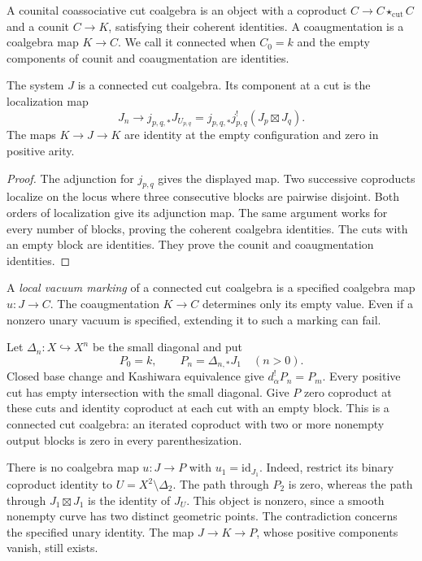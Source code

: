 A counital coassociative cut coalgebra is an object with a
coproduct \(C\to C\star_{\mathrm{cut}}C\) and a counit
\(C\to K\), satisfying their coherent identities. A coaugmentation
is a coalgebra map \(K\to C\). We call it connected when
\(C_0=k\) and the empty components of counit and coaugmentation
are identities.

\begin{proposition}\label{v4-prop:word-vacuum-coalgebra}
The system \(J\) is a connected cut coalgebra. Its component at a
cut is the localization map
\begin{equation}\label{v4-eq:word-vacuum-coproduct}
 J_n\longrightarrow j_{p,q,*}J_{U_{p,q}}
       =j_{p,q,*}j_{p,q}^!(J_p\boxtimes J_q).
\end{equation}
The maps \(K\to J\to K\) are identity at the empty
configuration and zero in positive arity.
\end{proposition}

\begin{proof}
The adjunction for \(j_{p,q}\) gives the displayed map.
Two successive coproducts localize on the locus where three
consecutive blocks are pairwise disjoint. Both orders of
localization give its adjunction map. The same argument works for
every number of blocks, proving the coherent coalgebra identities.
The cuts with an empty block are identities. They prove the
counit and coaugmentation identities.
\end{proof}

A \emph{local vacuum marking} of a connected cut coalgebra is a
specified coalgebra map \(u:J\to C\). The coaugmentation
\(K\to C\) determines only its empty value. Even if a nonzero
unary vacuum is specified, extending it to such a marking can fail.

\begin{example}
\label{v4-ex:word-vacuum-obstruction}
Let \(\Delta_n:X\hookrightarrow X^n\) be the small diagonal and put
\[
 P_0=k,\qquad P_n=\Delta_{n,*}J_1\quad(n>0).
\]
Closed base change and Kashiwara equivalence give
\(d_\alpha^!P_n=P_m\). Every positive cut has empty intersection
with the small diagonal. Give \(P\) zero coproduct at these cuts
and identity coproduct at each cut with an empty block. This is a
connected cut coalgebra: an iterated coproduct with two or more
nonempty output blocks is zero in every parenthesization.

There is no coalgebra map \(u:J\to P\) with \(u_1=\mathrm{id}_{J_1}\).
Indeed, restrict its binary coproduct identity to
\(U=X^2\setminus\Delta_2\). The path through \(P_2\) is zero,
whereas the path through \(J_1\boxtimes J_1\) is the identity of
\(J_U\). This object is nonzero, since a smooth nonempty curve has
two distinct geometric points. The contradiction concerns the
specified unary identity. The map \(J\to K\to P\), whose
positive components vanish, still exists.
\end{example}

